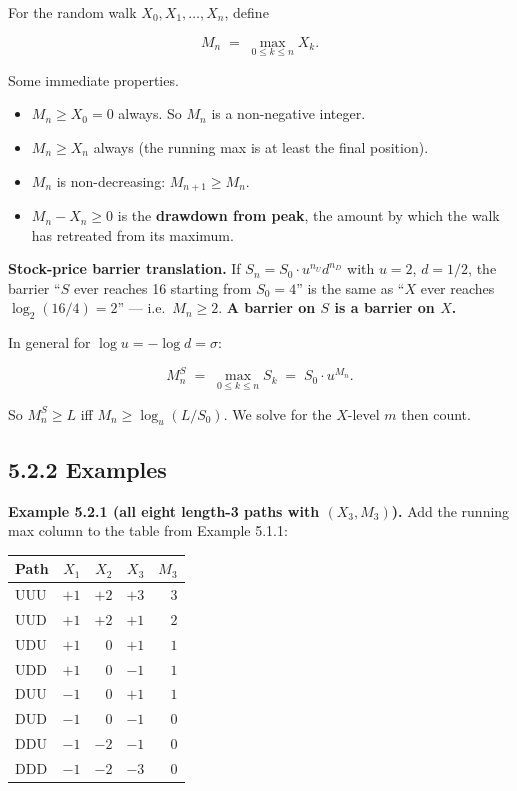 \documentclass[
  10pt,
  twoside]{book}
\newcounter{none} %
\providecommand{\tightlist}{%
  \setlength{\itemsep}{0pt}\setlength{\parskip}{0pt}}
\begin{document}
For the random walk \(X_0, X_1, \ldots, X_n\), define

\[M_n \;=\; \max_{0 \le k \le n} X_k.\]

Some immediate properties.

\begin{itemize}
\tightlist
\item
  \(M_n \ge X_0 = 0\) always. So \(M_n\) is a non-negative integer.
\item
  \(M_n \ge X_n\) always (the running max is at least the final
  position).
\item
  \(M_n\) is non-decreasing: \(M_{n+1} \ge M_n\).
\item
  \(M_n - X_n \ge 0\) is the \textbf{drawdown from peak}, the amount by
  which the walk has retreated from its maximum.
\end{itemize}

\textbf{Stock-price barrier translation.} If
\(S_n = S_0 \cdot u^{n_U} d^{n_D}\) with \(u = 2\), \(d = 1/2\), the
barrier ``\(S\) ever reaches 16 starting from \(S_0 = 4\)'' is the same
as ``\(X\) ever reaches \(\log_2(16/4) = 2\)'' --- i.e.~\(M_n \ge 2\).
\textbf{A barrier on \(S\) is a barrier on \(X\).}

In general for \(\log u = -\log d = \sigma\):

\[M^S_n \;=\; \max_{0 \le k \le n} S_k \;=\; S_0 \cdot u^{M_n}.\]

So \(M^S_n \ge L\) iff \(M_n \ge \log_u(L/S_0)\). We solve for the
\(X\)-level \(m\) then count.

\subsection{5.2.2 Examples}\label{examples-24}

\textbf{Example 5.2.1 (all eight length-3 paths with \((X_3, M_3)\)).}
Add the running max column to the table from Example 5.1.1:

{\def\LTcaptype{none} %
\begin{table}[H]
\centering
\begin{tabular}{|l|r|r|r|r|}
\toprule
Path & \(X_1\) & \(X_2\) & \(X_3\) & \(M_3\) \\
\midrule



UUU & \(+1\) & \(+2\) & \(+3\) & \(3\) \\
UUD & \(+1\) & \(+2\) & \(+1\) & \(2\) \\
UDU & \(+1\) & \(0\) & \(+1\) & \(1\) \\
UDD & \(+1\) & \(0\) & \(-1\) & \(1\) \\
DUU & \(-1\) & \(0\) & \(+1\) & \(1\) \\
DUD & \(-1\) & \(0\) & \(-1\) & \(0\) \\
DDU & \(-1\) & \(-2\) & \(-1\) & \(0\) \\
DDD & \(-1\) & \(-2\) & \(-3\) & \(0\) \\
\bottomrule
\end{tabular}
\end{table}
}
\end{document}
